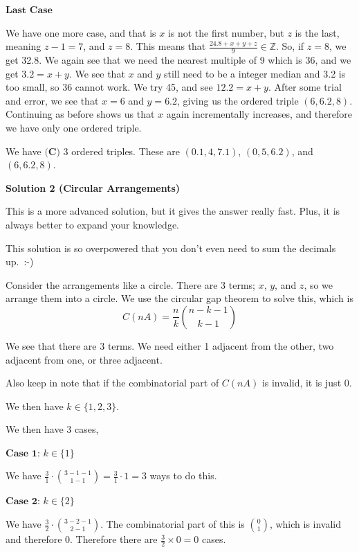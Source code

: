 \begin{enumerate}
 $\textbf{Last Case}$

 We have one more case, and that is \(x\) is not the first number, but \( z \) is the last, meaning \( z-1=7 \), and \( z=8 \). This means that \( \frac{24.8+x+y+z}{9} \in \mathbb{Z} \). So, if \( z=8 \), we get 32.8. We again see that we need the nearest multiple of 9 which is 36, and we get \( 3.2 = x+y \). We see that \( x \) and \( y \) still need to be a integer median and 3.2 is too small, so 36 cannot work. We try 45, and see \( 12.2 = x+y \). After some trial and error, we see that \( x=6 \) and \( y=6.2 \), giving us the ordered triple \( (6,6.2,8) \). Continuing as before shows us that \( x \) again incrementally increases, and therefore we have only one ordered triple.

 We have $\boxed{\textbf{(C) }3}$ ordered triples. These are \( (0.1,4,7.1) \), \( (0,5,6.2) \), and \( (6,6.2,8) \).

 



\textbf{Solution 2 (Circular Arrangements)}

This is a more advanced solution, but it gives the answer really fast. Plus, it is always better to expand your knowledge.

 This solution is so overpowered that you don't even need to sum the decimals up. :-)

 Consider the arrangements like a circle. There are 3 terms; \( x \), \( y \), and \( z \), so we arrange them into a circle. We use the circular gap theorem to solve this, which is 
 \[C(nA) = \frac{n}{k} \binom{n-k-1}{k-1}\]

 We see that there are 3 terms. We need either 1 adjacent from the other, two adjacent from one, or three adjacent.

 Also keep in note that if the combinatorial part of \( C(nA) \) is invalid, it is just 0.

 We then have \( k \in \{1, 2, 3\} \).

 We then have 3 cases,

 $\textbf{Case 1:}$ $k \in \{1\}$

 We have \(  \frac{3}{1} \cdot \binom{3-1-1}{1-1} = \frac{3}{1} \cdot 1 = 3 \) ways to do this.

 $\textbf{Case 2:}$ $k \in \{2\}$

 We have \( \frac{3}{2} \cdot \binom{3-2-1}{2-1} \). The combinatorial part of this is \( \binom{0}{1} \), which is invalid and therefore 0. Therefore there are \( \frac{3}{2} \times 0 = 0 \) cases.


\end{enumerate}
